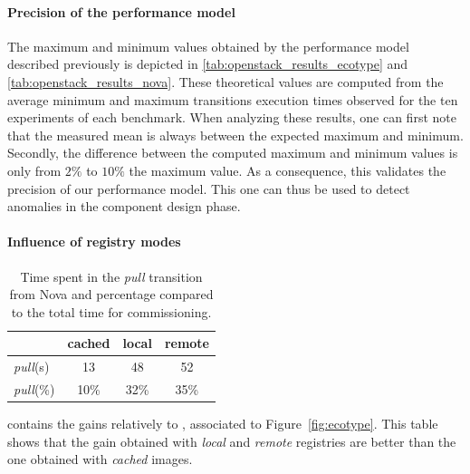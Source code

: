 \paragraph{Precision of the performance model}
The maximum and minimum values obtained by the performance model
described previously is depicted in
\cref{tab:openstack_results_ecotype} and \cref{tab:openstack_results_nova}. These theoretical values are computed
from the average minimum and maximum transitions execution times
observed for the ten experiments of each benchmark. When analyzing
these results, one can first note that the measured mean is always
between the expected maximum and minimum. Secondly, the difference
between the computed maximum and minimum values is only from $2\%$ to
$10\%$ the maximum value. As a consequence, this validates the
precision of our performance model.  This one can thus be used to
detect anomalies in the component design phase.


\paragraph{Influence of registry modes}

\begin{table}
  \begin{center}
    \begin{tabular}{lccc}
      \toprule
      & cached & local & remote\\
      \midrule
      \emph{pull}(s) & 13 & 48 & 52\\
      \emph{pull}(\%) & 10\% & 32\% & 35\%\\
      \bottomrule
    \end{tabular}
    \caption{Time spent in the \emph{pull} transition from Nova and
    percentage compared to the total time for \madass commissioning.}
    \label{tab:pull}
  \end{center}
\end{table}
 contains the gains relatively to \ansass,
associated to Figure~\ref{fig:ecotype}. This table shows that the gain
obtained with \emph{local} and \emph{remote} registries are better
than the one obtained with \emph{cached} \docker images.

